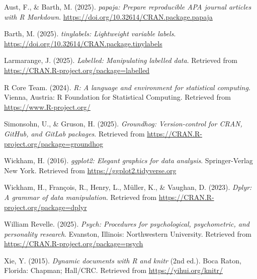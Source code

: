 \documentclass[
  english,
  man,floatsintext]{apa6}
\newlength{\cslhangindent}
\newenvironment{CSLReferences}[2] %
 {\begin{list}{}{%
  \setlength{\itemindent}{0pt}
  \setlength{\leftmargin}{0pt}
  \setlength{\parsep}{0pt}
  \ifodd #1
   \setlength{\leftmargin}{\cslhangindent}
   \setlength{\itemindent}{-1\cslhangindent}
  \fi
  \setlength{\itemsep}{#2\baselineskip}}}
 {\end{list}}
\begin{document}
\label{refs}
\begin{CSLReferences}{1}{0}
Aust, F., \& Barth, M. (2025). \emph{{papaja}: {Prepare} reproducible {APA} journal articles with {R Markdown}}. \url{https://doi.org/10.32614/CRAN.package.papaja}

Barth, M. (2025). \emph{{tinylabels}: Lightweight variable labels}. \url{https://doi.org/10.32614/CRAN.package.tinylabels}

Larmarange, J. (2025). \emph{Labelled: Manipulating labelled data}. Retrieved from \url{https://CRAN.R-project.org/package=labelled}

R Core Team. (2024). \emph{R: A language and environment for statistical computing}. Vienna, Austria: R Foundation for Statistical Computing. Retrieved from \url{https://www.R-project.org/}

Simonsohn, U., \& Gruson, H. (2025). \emph{Groundhog: Version-control for CRAN, GitHub, and GitLab packages}. Retrieved from \url{https://CRAN.R-project.org/package=groundhog}

Wickham, H. (2016). \emph{ggplot2: Elegant graphics for data analysis}. Springer-Verlag New York. Retrieved from \url{https://ggplot2.tidyverse.org}

Wickham, H., François, R., Henry, L., Müller, K., \& Vaughan, D. (2023). \emph{Dplyr: A grammar of data manipulation}. Retrieved from \url{https://CRAN.R-project.org/package=dplyr}

William Revelle. (2025). \emph{Psych: Procedures for psychological, psychometric, and personality research}. Evanston, Illinois: Northwestern University. Retrieved from \url{https://CRAN.R-project.org/package=psych}

Xie, Y. (2015). \emph{Dynamic documents with {R} and knitr} (2nd ed.). Boca Raton, Florida: Chapman; Hall/CRC. Retrieved from \url{https://yihui.org/knitr/}

\end{CSLReferences}
\end{document}
